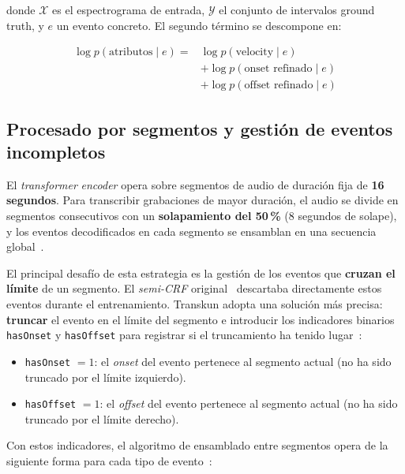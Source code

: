 \documentclass[11pt,spanish,listoffigures,listoftables]{tfgetsinf}
\begin{document}
\noindent donde $\mathcal{X}$ es el espectrograma de entrada, $\mathcal{Y}$ el
conjunto de intervalos ground truth, y $e$ un evento
concreto. El segundo término se descompone en:

\begin{equation}
\begin{split}
  \log p(\text{atributos} \mid e) ={}&
  \log p(\text{velocity} \mid e) \\
  &+ \log p(\text{onset refinado} \mid e) \\
  &+ \log p(\text{offset refinado} \mid e)
\end{split}
\label{eq:loss_attrs}
\end{equation}

\subsection*{Procesado por segmentos y gestión de eventos incompletos}

El \textit{transformer} \textit{encoder} opera sobre segmentos de audio de duración fija de
\textbf{16 segundos}. Para transcribir grabaciones de mayor duración, el audio se
divide en segmentos consecutivos con un \textbf{solapamiento del 50\,\%} (8
segundos de solape), y los eventos decodificados en cada segmento se ensamblan
en una secuencia global~\cite{yan2024transkun}.

El principal desafío de esta estrategia es la gestión de los eventos que
\textbf{cruzan el límite} de un segmento. El \textit{semi-CRF} original~\cite{yan2021semicrf1}
descartaba directamente estos eventos durante el entrenamiento. Transkun adopta
una solución más precisa: \textbf{truncar} el evento en el límite del segmento e
introducir los indicadores binarios \texttt{hasOnset} y \texttt{hasOffset} para
registrar si el truncamiento ha tenido lugar~\cite{yan2024transkun}:

\begin{itemize}
  \item \texttt{hasOnset} $= 1$: el \textit{onset} del evento pertenece al segmento actual
  (no ha sido truncado por el límite izquierdo).
  \item \texttt{hasOffset} $= 1$: el \textit{offset} del evento pertenece al segmento actual
  (no ha sido truncado por el límite derecho).
\end{itemize}

Con estos indicadores, el algoritmo de ensamblado entre segmentos opera de la
siguiente forma para cada tipo de evento~\cite{yan2024transkun}:
\end{document}
